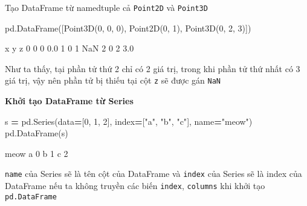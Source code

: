 \documentclass[
]{book}
\newenvironment{Shaded}{\begin{snugshade}}{\end{snugshade}}
\newcommand{\DecValTok}[1]{\textcolor[rgb]{0.00,0.00,0.81}{#1}}
\newcommand{\FloatTok}[1]{\textcolor[rgb]{0.00,0.00,0.81}{#1}}
\newcommand{\NormalTok}[1]{#1}
\newcommand{\OperatorTok}[1]{\textcolor[rgb]{0.81,0.36,0.00}{\textbf{#1}}}
\newcommand{\StringTok}[1]{\textcolor[rgb]{0.31,0.60,0.02}{#1}}
\begin{document}
Tạo DataFrame từ namedtuple cả \texttt{Point2D} và \texttt{Point3D}

\begin{Shaded}
\begin{Highlighting}[]
\NormalTok{pd.DataFrame([Point3D(}\DecValTok{0}\NormalTok{, }\DecValTok{0}\NormalTok{, }\DecValTok{0}\NormalTok{), Point2D(}\DecValTok{0}\NormalTok{, }\DecValTok{1}\NormalTok{), Point3D(}\DecValTok{0}\NormalTok{, }\DecValTok{2}\NormalTok{, }\DecValTok{3}\NormalTok{)])}
\end{Highlighting}
\end{Shaded}

\begin{Shaded}
\begin{Highlighting}[]
\NormalTok{   x  y    z}
\DecValTok{0}  \DecValTok{0}  \DecValTok{0}  \FloatTok{0.0}
\DecValTok{1}  \DecValTok{0}  \DecValTok{1}\NormalTok{  NaN}
\DecValTok{2}  \DecValTok{0}  \DecValTok{2}  \FloatTok{3.0}
\end{Highlighting}
\end{Shaded}

Như ta thấy, tại phần tử thứ 2 chỉ có 2 giá trị, trong khi phần tử thứ nhất có 3 giá trị, vậy nên phần tử bị thiếu tại cột \texttt{z} sẽ được gán \texttt{NaN}

\textbf{Khởi tạo DataFrame từ Series}

\begin{Shaded}
\begin{Highlighting}[]
\NormalTok{s }\OperatorTok{=}\NormalTok{ pd.Series(data}\OperatorTok{=}\NormalTok{[}\DecValTok{0}\NormalTok{, }\DecValTok{1}\NormalTok{, }\DecValTok{2}\NormalTok{], index}\OperatorTok{=}\NormalTok{[}\StringTok{"a"}\NormalTok{, }\StringTok{"b"}\NormalTok{, }\StringTok{"c"}\NormalTok{], name}\OperatorTok{=}\StringTok{"meow"}\NormalTok{)}
\NormalTok{pd.DataFrame(s)}
\end{Highlighting}
\end{Shaded}

\begin{Shaded}
\begin{Highlighting}[]
\NormalTok{   meow}
\NormalTok{a     }\DecValTok{0}
\NormalTok{b     }\DecValTok{1}
\NormalTok{c     }\DecValTok{2}
\end{Highlighting}
\end{Shaded}

\texttt{name} của Series sẽ là tên cột của DataFrame và \texttt{index} của Series sẽ là index của DataFrame nếu ta không truyền các biến \texttt{index}, \texttt{columns} khi khởi tạo \texttt{pd.DataFrame}
\end{document}
